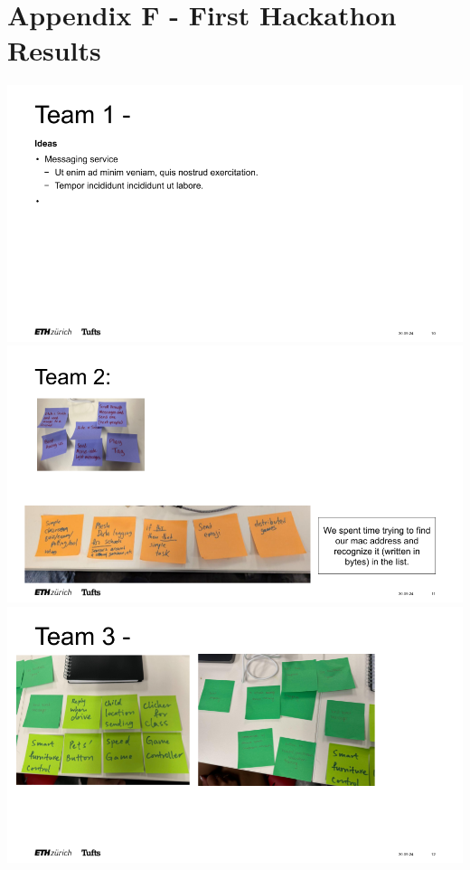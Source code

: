 \cleardoublepage%
\chapter*{\label{chap:apx_g}Appendix F - First Hackathon Results}%
%


\includegraphics[width=\linewidth]{overleaf/images/Hackathon1.png}
\includegraphics[width=\linewidth]{overleaf/images/Hackathon2.png}
\includegraphics[width=\linewidth]{overleaf/images/Hackathon3.png}
